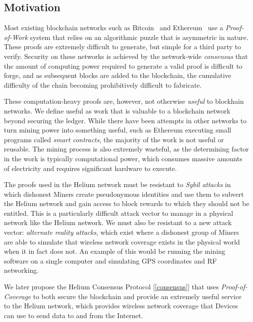 \documentclass[10pt, nonatbib, nocopyrightspace, reprint]{sigplanconf}
\newcommand{\secref}[1]{[\autoref{#1}]}
\begin{document}
\subsection{Motivation}

Most existing blockchain networks such as Bitcoin~\cite{bitcoin} and Ethereum~\cite{ethereum} use a \emph{Proof-of-Work} system that relies on an algorithmic puzzle that is asymmetric in nature. These proofs are extremely difficult to generate, but simple for a third party to verify. Security on these networks is achieved by the network-wide \emph{consensus} that the amount of computing power required to generate a valid proof is difficult to forge, and as subsequent blocks are added to the blockchain, the cumulative difficulty of the chain becoming prohibitively difficult to fabricate.

These computation-heavy proofs are, however, not otherwise \emph{useful} to blockhain networks. We define useful as work that is valuable to a blockchain network beyond securing the ledger. While there have been attempts in other networks to turn mining power into something useful, such as Ethereum executing small programs called \emph{smart contracts}, the majority of the work is not useful or reusable. The mining process is also extremely wasteful, as the determining factor in the work is typically computational power, which consumes massive amounts of electricity and requires significant hardware to execute.

The proofs used in the Helium network must be resistant to \emph{Sybil attacks} in which dishonest Miners create pseudonymous identities and use them to subvert the Helium network and gain access to block rewards to which they should not be entitled. This is a particularly difficult attack vector to manage in a physical network like the Helium network. We must also be resistant to a new attack vector: \emph{alternate reality attacks}, which exist where a dishonest group of Miners are able to simulate that wireless network coverage exists in the physical world when it in fact does not. An example of this would be running the mining software on a single computer and simulating GPS coordinates and RF networking.

We later propose the Helium Consensus Protocol \secref{consensus} that uses \emph{Proof-of-Coverage} to both secure the blockchain and provide an extremely useful service to the Helium network, which provides wireless network coverage that Devices can use to send data to and from the Internet.
\end{document}
